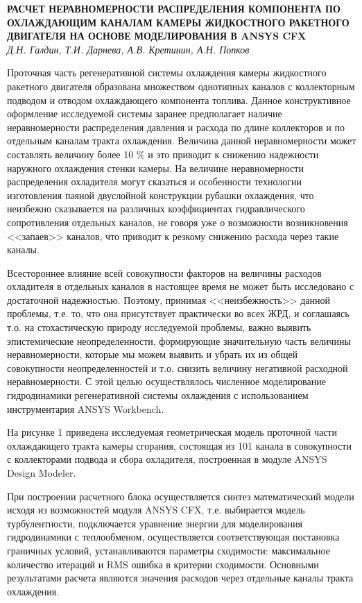 \begin{center}{ \bf  РАСЧЕТ НЕРАВНОМЕРНОСТИ РАСПРЕДЕЛЕНИЯ КОМПОНЕНТА ПО ОХЛАЖДАЮЩИМ КАНАЛАМ КАМЕРЫ ЖИДКОСТНОГО РАКЕТНОГО ДВИГАТЕЛЯ НА ОСНОВЕ МОДЕЛИРОВАНИЯ В ANSYS CFX}\\
{\it Д.Н. Галдин, Т.И. Дарнева, А.В. Кретинин, А.Н. Попков} \\
\end{center}

Проточная часть регенеративной системы охлаждения камеры жидкостного ракетного двигателя
образована множеством однотипных каналов с коллекторным подводом и отводом охлаждающего компонента топлива.
Данное конструктивное оформление исследуемой системы заранее пре\-д\-полагает
наличие неравномерности распределения давления и расхода по длине коллекторов и по отдельным каналам тракта охлаждения.
Величина данной неравномерности может составлять величину более 10 $\%$
и это приводит к снижению надежности наружного охлаждения стенки камеры.
На величине неравномерности распределения охладителя могут сказаться
и особенности технологии изготовления паяной двуслойной конструкции рубашки охлаждения,
что неизбежно сказывается на различных коэффициентах гидравлического сопротивления отдельных каналов,
не говоря уже о возможности возникновения <<запаев>> каналов, что приводит к резкому снижению расхода через такие каналы.

Всестороннее влияние всей совокупности факторов на величины расходов охладителя в отдельных каналов
в настоящее время не может быть исследовано с достаточной надежностью.
Поэтому, принимая <<неизбежность>> данной проблемы, т.е. то, что она присутствует практически во всех ЖРД,
и соглашаясь т.о. на стохастическую природу исследуемой проблемы, важно выявить эпистемические неопределенности,
формирующие значительную часть величины неравномерности,
которые мы можем выявить и убрать их из общей совокупности неопределенностей
и т.о. снизить величину негативной расходной неравномерности.
С этой целью осуществлялось численное моделирование гидродинамики регенеративной системы охлаждения с использованием инструментария ANSYS Workbench.

На рисунке 1 приведена исследуемая геометрическая модель проточной части охлаждающего тракта камеры сгорания,
состоящая из 101 канала в совокупности с коллекторами подвода и сбора охладителя,
построенная в модуле ANSYS Design Modeler.

При построении расчетного блока осуществляется синтез математический модели исходя из возможностей модуля ANSYS CFX, т.е. выбирается модель турбулентности, подключается уравнение энергии для моделирования гидродинамики с теплообменом, осуществляется соответствующая постановка граничных условий, устанавливаются параметры сходимости: максимальное количество итераций и RMS ошибка в критерии сходимости. Основными результатами расчета являются значения расходов через отдельные каналы тракта охлаждения.

